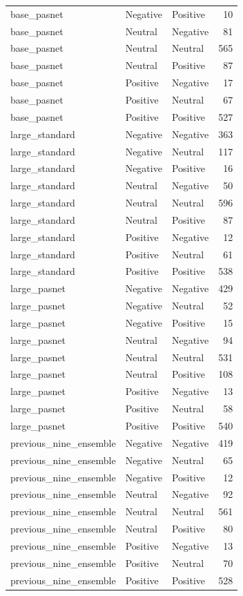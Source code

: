 \begin{tabular}{lllr}
base\_pasnet & Negative & Positive & 10 \\
base\_pasnet & Neutral & Negative & 81 \\
base\_pasnet & Neutral & Neutral & 565 \\
base\_pasnet & Neutral & Positive & 87 \\
base\_pasnet & Positive & Negative & 17 \\
base\_pasnet & Positive & Neutral & 67 \\
base\_pasnet & Positive & Positive & 527 \\
large\_standard & Negative & Negative & 363 \\
large\_standard & Negative & Neutral & 117 \\
large\_standard & Negative & Positive & 16 \\
large\_standard & Neutral & Negative & 50 \\
large\_standard & Neutral & Neutral & 596 \\
large\_standard & Neutral & Positive & 87 \\
large\_standard & Positive & Negative & 12 \\
large\_standard & Positive & Neutral & 61 \\
large\_standard & Positive & Positive & 538 \\
large\_pasnet & Negative & Negative & 429 \\
large\_pasnet & Negative & Neutral & 52 \\
large\_pasnet & Negative & Positive & 15 \\
large\_pasnet & Neutral & Negative & 94 \\
large\_pasnet & Neutral & Neutral & 531 \\
large\_pasnet & Neutral & Positive & 108 \\
large\_pasnet & Positive & Negative & 13 \\
large\_pasnet & Positive & Neutral & 58 \\
large\_pasnet & Positive & Positive & 540 \\
previous\_nine\_ensemble & Negative & Negative & 419 \\
previous\_nine\_ensemble & Negative & Neutral & 65 \\
previous\_nine\_ensemble & Negative & Positive & 12 \\
previous\_nine\_ensemble & Neutral & Negative & 92 \\
previous\_nine\_ensemble & Neutral & Neutral & 561 \\
previous\_nine\_ensemble & Neutral & Positive & 80 \\
previous\_nine\_ensemble & Positive & Negative & 13 \\
previous\_nine\_ensemble & Positive & Neutral & 70 \\
previous\_nine\_ensemble & Positive & Positive & 528 \\
\bottomrule
\end{tabular}
